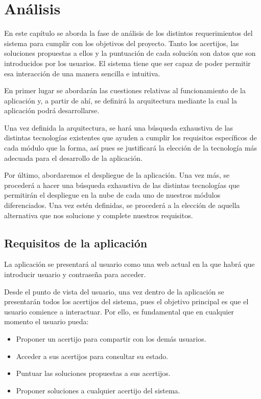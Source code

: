 \chapter{Análisis}
En este capítulo se aborda la fase de análisis de los distintos requerimientos  del sistema para cumplir con los objetivos del proyecto. Tanto los acertijos, las soluciones propuestas a ellos y la puntuación de cada solución son datos que son introducidos por los usuarios. El sistema tiene que ser capaz de poder permitir esa interacción de una manera sencilla e intuitiva.

En primer lugar se abordarán las cuestiones relativas al funcionamiento de la aplicación y, a partir de ahí, se definirá la arquitectura mediante la cual la aplicación podrá desarrollarse.

Una vez definida la arquitectura, se hará una búsqueda exhaustiva de las distintas tecnologías existentes que ayuden a cumplir los requisitos específicos de cada módulo que la forma, así pues se justificará la elección de la tecnología más adecuada para el desarrollo de la aplicación.

Por último, abordaremos el despliegue de la aplicación. Una vez más, se procederá a hacer una búsqueda exhaustiva de las distintas tecnologías que permitirán el despliegue en la nube de cada uno de nuestros módulos diferenciados. Una vez estén definidas, se procederá a la elección de aquella alternativa que nos solucione y complete nuestros requisitos.

\section{Requisitos de la aplicación}

La aplicación se presentará al usuario como una web actual en la que habrá que introducir usuario y contraseña para acceder. 

Desde el punto de vista del usuario, una vez dentro de la aplicación se presentarán todos los acertijos del sistema, pues el objetivo principal es que el usuario comience a interactuar. Por ello, es fundamental que en cualquier momento el usuario pueda:

\begin{itemize}
    \item Proponer un acertijo para compartir con los demás usuarios.
    \item Acceder a sus acertijos para consultar su estado.
    \item Puntuar las soluciones propuestas a sus acertijos.
    \item Proponer soluciones a cualquier acertijo del sistema.
\end{itemize}

